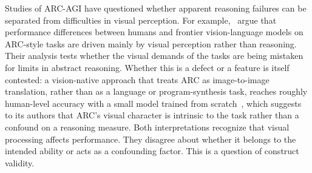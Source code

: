 \documentclass[acmsmall,screen,review,anonymous]{acmart}
\begin{document}
Studies of ARC-AGI have questioned whether apparent reasoning failures can be separated from difficulties in visual perception.
%
For example,~\citet{wang2026reasoningbenchmarktestreasoning} argue that performance differences between humans and frontier vision-language models on ARC-style tasks are driven mainly by visual perception rather than reasoning.
%
Their analysis tests whether the visual demands of the tasks are being mistaken for limits in abstract reasoning.
%
Whether this is a defect or a feature is itself contested: a vision-native approach that treats ARC as image-to-image translation, rather than as a language or program-synthesis task, reaches roughly human-level accuracy with a small model trained from scratch~\citep{hu2025arcvisionproblem}, which suggests to its authors that ARC's visual character is intrinsic to the task rather than a confound on a reasoning measure.
%
Both interpretations recognize that visual processing affects performance.
%
They disagree about whether it belongs to the intended ability or acts as a confounding factor.
%
This is a question of construct validity.
\end{document}
